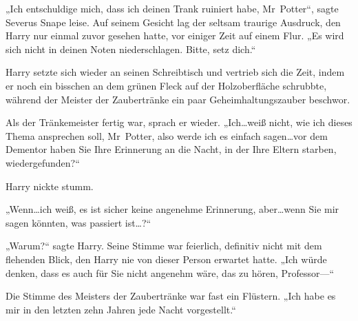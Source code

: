 „Ich entschuldige mich, dass ich deinen Trank ruiniert habe, Mr~Potter“, sagte Severus Snape leise. Auf seinem Gesicht lag der seltsam traurige Ausdruck, den Harry nur einmal zuvor gesehen hatte, vor einiger Zeit auf einem Flur. „Es wird sich nicht in deinen Noten niederschlagen. Bitte, setz dich.“

Harry setzte sich wieder an seinen Schreibtisch und vertrieb sich die Zeit, indem er noch ein bisschen an dem grünen Fleck auf der Holzoberfläche schrubbte, während der Meister der Zaubertränke ein paar Geheimhaltungszauber beschwor.

Als der Tränkemeister fertig war, sprach er wieder.
„Ich…weiß nicht, wie ich dieses Thema ansprechen soll, Mr~Potter, also werde ich es einfach sagen…vor dem Dementor haben Sie Ihre Erinnerung an die Nacht, in der Ihre Eltern starben, wiedergefunden?“

Harry nickte stumm.

„Wenn…ich weiß, es ist sicher keine angenehme Erinnerung, aber…wenn Sie mir sagen könnten, was passiert ist…?“

„Warum?“ sagte Harry.
Seine Stimme war feierlich, definitiv nicht mit dem flehenden Blick, den Harry nie von dieser Person erwartet hatte.
„Ich würde denken, dass es auch für Sie nicht angenehm wäre, das zu hören, Professor—“

Die Stimme des Meisters der Zaubertränke war fast ein Flüstern.
„Ich habe es mir in den letzten zehn Jahren jede Nacht vorgestellt.“

